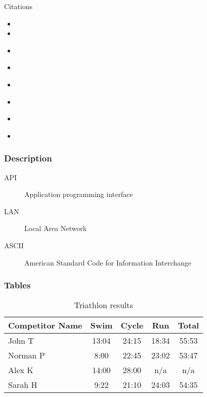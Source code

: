 \documentclass{beamer}
\begin{document}
\begin{frame}{Citations}
	
	\begin{itemize}
		\item {}
		
		\item {}
		
		\item \citep*{AkiyamaEtAl2020}
		
		\item \citet*{AkiyamaEtAl2020}
		
		\item \citealp*{BaranyEtAl2019}
		
		\item \citeauthor{BarralFeng2021}
		
		\item \citeauthor{BarreiraEtAl1999}
		
		\item \citeauthor{Erdoes1939}
	\end{itemize}
	
\end{frame}


\begin{frame}
	\frametitle{Description}
	\begin{description}
		\item[API] Application programming interface
		\item[LAN] Local Area Network
		\item[ASCII] American Standard Code for Information Interchange
	\end{description}
\end{frame}

\begin{frame}
	\frametitle{Tables}
	\begin{table}
		\centering
		\begin{tabular}{l | c | c | c | c }
			Competitor Name & Swim  & Cycle & Run   & Total \\
			\hline 
			John T          & 13:04 & 24:15 & 18:34 & 55:53 \\
			Norman P        & 8:00  & 22:45 & 23:02 & 53:47 \\
			Alex K          & 14:00 & 28:00 & n/a   & n/a   \\
			Sarah H         & 9:22  & 21:10 & 24:03 & 54:35
		\end{tabular}
		\caption{Triathlon results}
		\label{tab:1}
	\end{table}
	
\end{frame}
\end{document}
